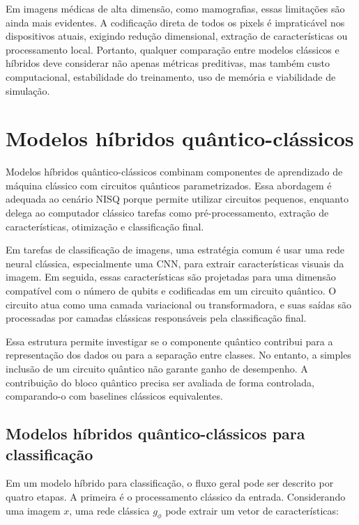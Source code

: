 \documentclass[
    12pt,
    openright,
    oneside,
    a4paper,
    english,
    brazil
]{abntex2}
\begin{document}
Em imagens médicas de alta dimensão, como mamografias, essas limitações são ainda mais evidentes. A codificação direta de todos os pixels é impraticável nos dispositivos atuais, exigindo redução dimensional, extração de características ou processamento local. Portanto, qualquer comparação entre modelos clássicos e híbridos deve considerar não apenas métricas preditivas, mas também custo computacional, estabilidade do treinamento, uso de memória e viabilidade de simulação.


\section{Modelos híbridos quântico-clássicos}

Modelos híbridos quântico-clássicos combinam componentes de aprendizado de máquina clássico com circuitos quânticos parametrizados. Essa abordagem é adequada ao cenário NISQ porque permite utilizar circuitos pequenos, enquanto delega ao computador clássico tarefas como pré-processamento, extração de características, otimização e classificação final.

Em tarefas de classificação de imagens, uma estratégia comum é usar uma rede neural clássica, especialmente uma CNN, para extrair características visuais da imagem. Em seguida, essas características são projetadas para uma dimensão compatível com o número de qubits e codificadas em um circuito quântico. O circuito atua como uma camada variacional ou transformadora, e suas saídas são processadas por camadas clássicas responsáveis pela classificação final.

Essa estrutura permite investigar se o componente quântico contribui para a representação dos dados ou para a separação entre classes. No entanto, a simples inclusão de um circuito quântico não garante ganho de desempenho. A contribuição do bloco quântico precisa ser avaliada de forma controlada, comparando-o com baselines clássicos equivalentes.

\subsection{Modelos híbridos quântico-clássicos para classificação}

Em um modelo híbrido para classificação, o fluxo geral pode ser descrito por quatro etapas. A primeira é o processamento clássico da entrada. Considerando uma imagem \(x\), uma rede clássica \(g_{\phi}\) pode extrair um vetor de características:
\end{document}
